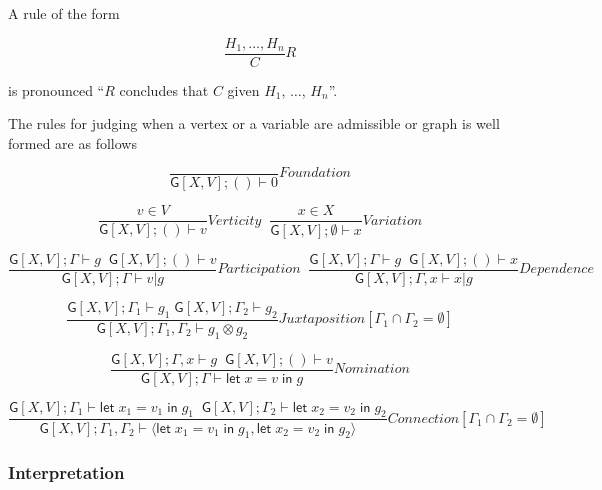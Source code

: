 \documentclass[12pt]{llncs}
\begin{document}
A rule of the form

\[\frac{ H_1, \ldots , H_n }{ C }R\]

is pronounced ``\(R\) concludes that \(C\) given \(H_1\), \(\ldots\),
\(H_n\)''.

The rules for judging when a vertex or a variable are admissible or
graph is well formed are as follows

\[\frac{ }{ \mathsf{G}[X,V]; () \vdash 0}Foundation\]

\[\frac{ v \in V }{ \mathsf{G}[X,V]; () \vdash v}Verticity \;\;\frac{ x \in X }{ \mathsf{G}[X,V]; \emptyset \vdash x}Variation\]

\[\frac{ \mathsf{G}[X,V]; \Gamma \vdash g \;\; \mathsf{G}[X,V]; () \vdash v }{ \mathsf{G}[X,V]; \Gamma \vdash v | g}Participation \; \; \frac{ \mathsf{G}[X,V]; \Gamma \vdash g \;\; \mathsf{G}[X,V]; () \vdash x }{ \mathsf{G}[X,V]; \Gamma, x \vdash x | g}Dependence\]

\[\frac{ \mathsf{G}[X,V]; \Gamma_1 \vdash g_1 \; \mathsf{G}[X,V]; \Gamma_2 \vdash g_2}{ \mathsf{G}[X,V]; \Gamma_1, \Gamma_2 \vdash g_1 \otimes g_2}Juxtaposition[\Gamma_1 \cap \Gamma_2 = \emptyset]\]

\[\frac{ \mathsf{G}[X,V]; \Gamma,x \vdash g \; \;\mathsf{G}[X,V]; () \vdash v}{ \mathsf{G}[X,V]; \Gamma \vdash \mathsf{let}\; x = v \; \mathsf{in}\; g}Nomination\]

\[\frac{ \mathsf{G}[X,V]; \Gamma_1 \vdash \mathsf{let}\; x_1 = v_1 \; \mathsf{in}\; g_1 \; \;\mathsf{G}[X,V]; \Gamma_2 \vdash \mathsf{let}\; x_2 = v_2 \; \mathsf{in}\; g_2}{ \mathsf{G}[X,V]; \Gamma_1,\Gamma_2 \vdash \langle \mathsf{let}\; x_1 = v_1 \; \mathsf{in}\; g_1, \mathsf{let}\; x_2 = v_2 \; \mathsf{in}\; g_2 \rangle}Connection[\Gamma_1 \cap \Gamma_2 = \emptyset]\]

\hypertarget{interpretation}{%
\subsubsection{Interpretation}\label{interpretation}}
\end{document}
